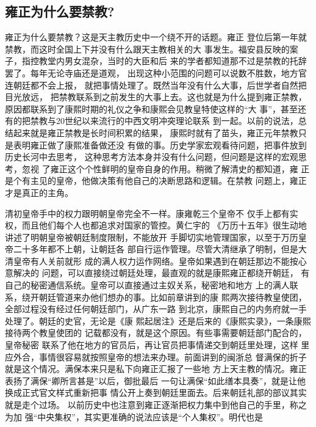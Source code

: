 \subsection{雍正为什么要禁教?}
\par
雍正为什么要禁教？这是天主教历史中一个绕不开的话题。雍正%
登位后第一年就禁教，而这时全国上下并没有什么跟天主教相关的大%
事发生。福安县反映的案子，指控教堂内男女混杂，当时的大臣和后%
来的学者都知道那不过是禁教的托辞罢了。每年无论寺庙还是道观，%
出现这种小范围的问题可以说数不胜数，地方官连朝廷都不会上报，%
就把事情处理了。既然当年没有什么大事，后世学者自然把目光放远，%
把禁教联系到之前发生的大事上去。这也就是为什么提到雍正禁教，%
原因都联系到了康熙时期的礼仪之争和康熙会见教皇特使这样的“大%
事”，甚至还有的把禁教与20世纪以来流行的中西文明冲突理论联系%
到一起。以前的说法，总结起来就是雍正禁教是长时间积累的结果，%
康熙时就有了苗头，雍正元年禁教只是表明雍正做了康熙准备做还没%
有做的事。历史学家宏观看待问题，把事件放到历史长河中去思考，%
这种思考方法本身并没有什么问题，但问题是这样的宏观思考，忽视%
了雍正这个个性鲜明的皇帝自身的作用。稍微了解清史的都知道，雍%
正是个有主见的皇帝，他做决策有他自己的决断思路和逻辑。在禁教%
问题上，雍正才是真正的主角。%
\par
清初皇帝手中的权力跟明朝皇帝完全不一样。康雍乾三个皇帝不%
仅手上都有实权，而且他们每个人也都追求对国家的管控。黄仁宇的%
《万历十五年》很生动地讲述了明朝皇帝被朝廷制度限制，不能放开%
手脚切实地管理国家，以至于万历皇帝二十多年都不上朝，让朝廷各%
部自行运作管理。尽管大清继承了明制，但是大清皇帝有人关前就形%
成的满人权力运作网络。皇帝如果遇到在朝廷那边不能按心意解决的%
问题，可以直接绕过朝廷处理，最直观的就是康熙雍正都绕开朝廷，%
有自己的秘密通信系统。皇帝可以直接通过主奴关系，秘密地和地方%
上的满人联系，绕开朝廷管道来办他们想办的事。比如前章讲到的康%
熙两次接待教皇使团，全部过程没有经过任何朝廷部门，从广东一路%
到北京，康熙自己的内务府就一手处理了。朝廷的史官，无论是《康%
熙起居注》还是后来的《康熙实录》，一条康熙接待两个教皇使团的%
记载都没有，就是这个原因。有些事需要朝廷部门配合的，皇帝秘密%
联系了他在地方的官员后，再让官员把事情递交到朝廷里处理，这样%
里应外合，事情很容易就按照皇帝的想法来办理。前面讲到的闽浙总%
督满保的折子就是这个情况。满保本来只是私下向雍正汇报了一些地%
方上天主教的情况。雍正表扬了满保“卿所言甚是”以后，御批最后%
一句让满保“如此缮本具奏”，就是让他换成正式官文样式重新把事%
情公开上奏到朝廷里面去。后来朝廷礼部的部议其实就是走个过场。%
以前历史中也注意到雍正逐渐把权力集中到他自己的手里，称之为加%
强“中央集权”，其实更准确的说法应该是“个人集权”。明代也是%
